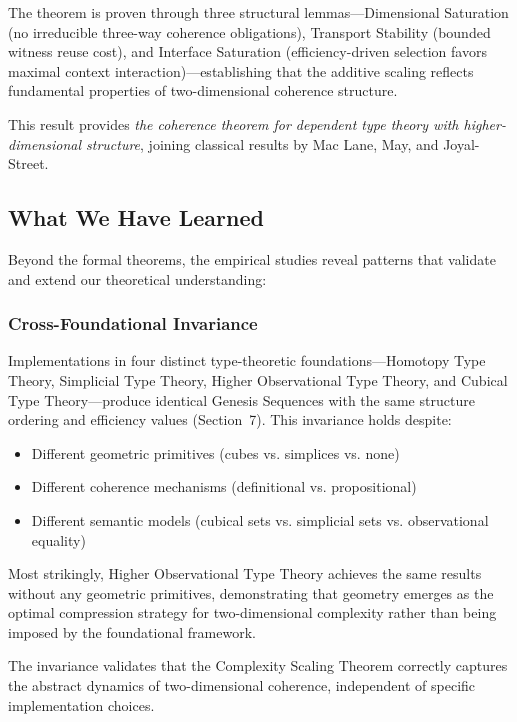 \documentclass[11pt]{article}
\theoremstyle{definition}
\theoremstyle{remark}
\begin{document}
The theorem is proven through three structural lemmas---Dimensional Saturation (no irreducible
three-way coherence obligations), Transport Stability (bounded witness reuse cost), and Interface
Saturation (efficiency-driven selection favors maximal context interaction)---establishing that the
additive scaling reflects fundamental properties of two-dimensional coherence structure.

This result provides \emph{the coherence theorem for dependent type theory with higher-dimensional
structure}, joining classical results by Mac Lane, May, and Joyal-Street.

\subsection{What We Have Learned}

Beyond the formal theorems, the empirical studies reveal patterns that validate and extend our
theoretical understanding:

\subsubsection{Cross-Foundational Invariance}

Implementations in four distinct type-theoretic foundations---Homotopy Type Theory, Simplicial
Type Theory, Higher Observational Type Theory, and Cubical Type Theory---produce identical
Genesis Sequences with the same structure ordering and efficiency values (Section~7). This invariance
holds despite:
\begin{itemize}
\item Different geometric primitives (cubes vs. simplices vs. none)
\item Different coherence mechanisms (definitional vs. propositional)
\item Different semantic models (cubical sets vs. simplicial sets vs. observational equality)
\end{itemize}

Most strikingly, Higher Observational Type Theory achieves the same results without any geometric
primitives, demonstrating that geometry emerges as the optimal compression strategy for two-dimensional
complexity rather than being imposed by the foundational framework.

The invariance validates that the Complexity Scaling Theorem correctly captures the abstract
dynamics of two-dimensional coherence, independent of specific implementation choices.
\end{document}
